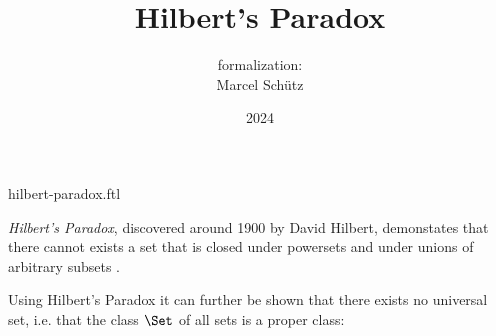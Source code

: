 \documentclass{article}
\title{Hilbert's Paradox}
\author{\Naproche formalization:\\[0.5em]Marcel Schütz}
\date{2024}
\begin{document}
\begin{smodule}{hilbert-paradox.ftl}
  \maketitle


  \noindent \emph{Hilbert's Paradox}, discovered around 1900 by David Hilbert, 
  demonstates that there cannot exists a set that is closed under powersets and 
  under unions of arbitrary subsets \cite{PeckhausKahl2002}.


  \noindent Using Hilbert's Paradox it can further be shown that there exists 
  no universal set, i.e. that the class $\Set$ of all sets is a proper class:


  \printbibliography
\end{smodule}
\end{document}
